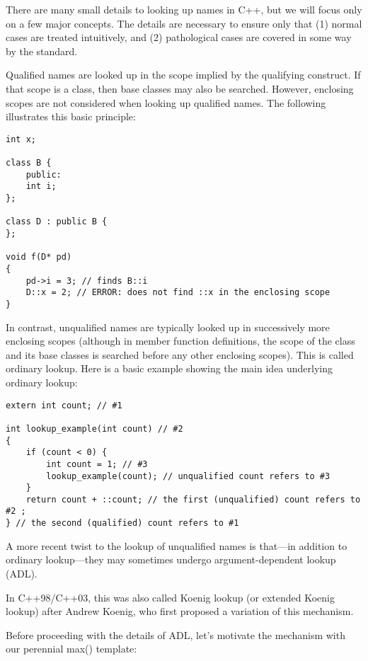 
There are many small details to looking up names in C++, but we will focus only on a few major concepts. The details are necessary to ensure only that (1) normal cases are treated intuitively, and (2) pathological cases are covered in some way by the standard.

Qualified names are looked up in the scope implied by the qualifying construct. If that scope is a class, then base classes may also be searched. However, enclosing scopes are not considered when looking up qualified names. The following illustrates this basic principle:

\begin{lstlisting}[style=styleCXX]
int x;

class B {
	public:
	int i;
};

class D : public B {
};

void f(D* pd)
{
	pd->i = 3; // finds B::i
	D::x = 2; // ERROR: does not find ::x in the enclosing scope
}
\end{lstlisting}

In contrast, unqualified names are typically looked up in successively more enclosing scopes (although in member function definitions, the scope of the class and its base classes is searched before any other enclosing scopes). This is called ordinary lookup. Here is a basic example showing the main idea underlying ordinary lookup:

\begin{lstlisting}[style=styleCXX]
extern int count; // #1

int lookup_example(int count) // #2
{
	if (count < 0) {
		int count = 1; // #3
		lookup_example(count); // unqualified count refers to #3
	}
	return count + ::count; // the first (unqualified) count refers to #2 ;
} // the second (qualified) count refers to #1
\end{lstlisting}

A more recent twist to the lookup of unqualified names is that—in addition to ordinary lookup—they may sometimes undergo argument-dependent lookup (ADL).

\begin{tcolorbox}[colback=webgreen!5!white,colframe=webgreen!75!black]
\hspace*{0.75cm}In C++98/C++03, this was also called Koenig lookup (or extended Koenig lookup) after Andrew Koenig, who first proposed a variation of this mechanism.
\end{tcolorbox}

Before proceeding with the details of ADL, let’s motivate the mechanism with our perennial max() template:

